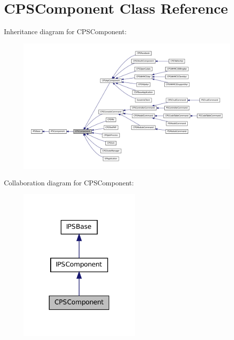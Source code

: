 \hypertarget{classCPSComponent}{
\section{CPSComponent Class Reference}
\label{classCPSComponent}
}


Inheritance diagram for CPSComponent:\nopagebreak
\begin{figure}[H]
\begin{center}
\leavevmode
\includegraphics[width=400pt]{classCPSComponent__inherit__graph}
\end{center}
\end{figure}


Collaboration diagram for CPSComponent:\nopagebreak
\begin{figure}[H]
\begin{center}
\leavevmode
\includegraphics[width=172pt]{classCPSComponent__coll__graph}
\end{center}
\end{figure}
